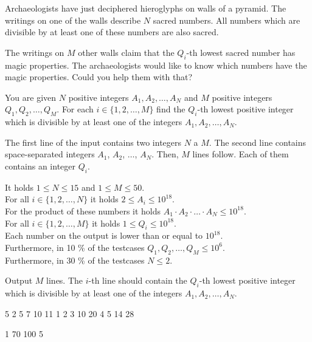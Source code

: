 





Archaeologists have just deciphered hieroglyphs on walls of a pyramid. The
writings on one of the walls describe $N$ sacred numbers. All numbers which are
divisible by at least one of these numbers are also sacred.

The writings on $M$ other walls claim that the $Q_i$-th lowest sacred number has
magic properties. The archaeologists would like to know which numbers have the
magic properties. Could you help them with that?


You are given $N$ positive integers $A_1, A_2, \ldots, A_N$ and $M$ positive
integers $Q_1, Q_2, \ldots, Q_M$. For each $i \in \{ 1, 2, \ldots, M \}$ find the
$Q_i$-th lowest positive integer which is divisible by at least one of the
integers $A_1, A_2, \ldots, A_N$.


The first line of the input contains two integers $N$ a $M$. The second line
contains space-separated integers $A_1$, $A_2$, $\ldots$, $A_N$. Then, $M$ lines
follow. Each of them contains an integer $Q_i$.

\bigskip
\noindent
It holds $1 \leq N \leq 15$ and $1 \leq M \leq 50$.\\
For all $i \in \{ 1, 2, \ldots, N \}$ it holds $2 \leq A_i \leq 10^{18}$.\\
For the product of these numbers it holds $A_1 \cdot A_2 \cdot \ldots \cdot A_N \leq 10^{18}$.\\
For all $i \in \{ 1, 2, \ldots, M \}$ it holds $1 \leq Q_i \leq 10^{18}$.\\
Each number on the output is lower than or equal to $10^{18}$.\\
Furthermore, in 10 \% of the testcases $Q_1, Q_2, \ldots, Q_M \leq 10^6$.\\
Furthermore, in 30 \% of the testcases $N \leq 2$.


Output $M$ lines. The $i$-th line should contain the $Q_i$-th lowest positive
integer which is divisible by at least one of the integers
$A_1, A_2, \ldots, A_N$.


 5
2 5 7 10 11
1
2
3
10
20
4
5
14
28
\sampleEND

 1
70 100
5
\sampleEND


